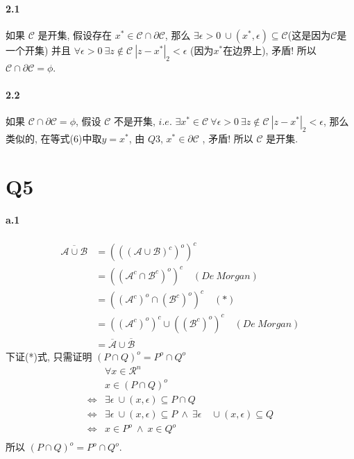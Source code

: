 \documentclass{article}
\begin{document}
\begin{CJK}{UTF8}{gbsn}
  \paragraph{2.1} 如果 $\mathcal{C}$ 是开集, 假设存在 $x^* \in \mathcal{C} \cap \partial \mathcal{C}$, 那么 $\exists \epsilon > 0\ \cup(x^*, \epsilon) \subseteq \mathcal{C}$(这是因为$\mathcal{C}$是一个开集) 并且 $\forall \epsilon > 0\ \exists z \not\in \mathcal{C}\ |z - x^*|_2 < \epsilon$ (因为$x^*$在边界上), 矛盾! 所以 $\mathcal{C} \cap \partial \mathcal{C} = \phi$.
  \paragraph{2.2} 如果 $\mathcal{C} \cap \partial \mathcal{C} = \phi$, 假设 $\mathcal{C}$ 不是开集, $i.e.$ $\exists x^* \in \mathcal{C}\  \forall \epsilon > 0\ \exists z \not\in \mathcal{C}\ |z - x^*|_2 < \epsilon$, 那么类似的, 在等式(6)中取$y = x^*$, 由 $Q3$, $x^* \in \partial \mathcal{C}$
  , 矛盾! 所以 $\mathcal{C}$ 是开集.

\section{Q5}
  \paragraph{a.1}
    \begin{equation}
      \begin{aligned}
        \overline{\mathcal{A} \cup \mathcal{B}} & = (((\mathcal{A} \cup \mathcal{B})^c)^o)^c \\
        & = ((\mathcal{A}^c \cap \mathcal{B}^c)^o)^c \quad (De\ Morgan) \\
        & = ((\mathcal{A}^c)^o \cap (\mathcal{B}^c)^o)^c \quad (*) \\
        & = ((\mathcal{A}^c)^o)^c \cup ((\mathcal{B}^c)^o)^c \quad (De\ Morgan) \\
        & = \overline{\mathcal{A}} \cup \overline{\mathcal{B}}
      \end{aligned}
    \end{equation}
    下证(*)式, 只需证明 $(P \cap Q)^o = P^o \cap Q^o$
    \begin{equation}
      \begin{aligned}
        & \forall x \in \mathcal{R}^n \\
        & x \in (P \cap Q)^o \\
        \iff & \exists \epsilon \ \cup (x, \epsilon) \subseteq P \cap Q \\
        \iff & \exists \epsilon \ \cup (x, \epsilon) \subseteq P \ \land\  \exists \epsilon \quad \cup (x, \epsilon) \subseteq Q \\
        \iff & x \in P^o \ \land\  x \in Q^o \\
      \end{aligned}
    \end{equation}
    所以 $(P \cap Q)^o = P^o \cap Q^o$.

\end{CJK}
\end{document}
